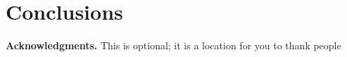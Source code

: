 \documentclass{mpaper}
\begin{document}

\section{Conclusions}


\vskip8pt \noindent
{\bf Acknowledgments.}
This is optional; it is a location for you to thank people



\end{document}
